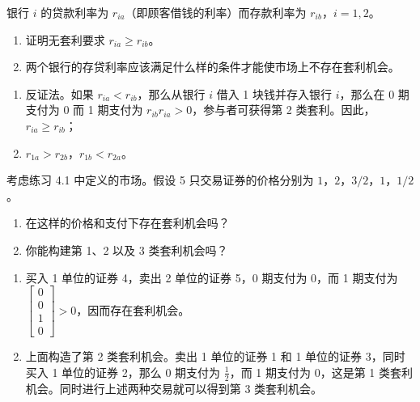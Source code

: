 \begin{problem}
 银行 $i$ 的贷款利率为 $r_{ia}$（即顾客借钱的利率）而存款利率为 $r_{ib}$，$i=1,2$。
\begin{enumerate}[label=(\alph*)]
    \item 证明无套利要求 $r_{ia}\ge r_{ib}$。
    \item 两个银行的存贷利率应该满足什么样的条件才能使市场上不存在套利机会。
\end{enumerate}
\end{problem}
\begin{solution}
\begin{enumerate}[label=(\alph*)]
    \item 反证法。如果 $r_{ia}<r_{ib}$，那么从银行 $i$ 借入 1 块钱并存入银行 $i$，那么在 0 期支付为 0 而 1 期支付为 $r_{ib}r_{ia}>0$，参与者可获得第 2 类套利。因此，$r_{ia}\ge r_{ib}$；
    \item $r_{1a}>r_{2b}$，$r_{1b}<r_{2a}$。
\end{enumerate}
\end{solution}

\begin{problem}
 考虑练习 4.1 中定义的市场。假设 5 只交易证券的价格分别为 $1$，$2$，$3/2$，$1$，$1/2$。
\begin{enumerate}[label=(\alph*)]
    \item 在这样的价格和支付下存在套利机会吗？
    \item 你能构建第 1、2 以及 3 类套利机会吗？
\end{enumerate}
\end{problem}
\begin{solution}
\begin{enumerate}[label=(\alph*)]
    \item 买入 1 单位的证券 4，卖出 2 单位的证券 5，0 期支付为 0，而 1 期支付为 $\begin{bmatrix}0 \\ 0 \\ 1 \\ 0\end{bmatrix}>0$，因而存在套利机会。
    \item 上面构造了第 2 类套利机会。卖出 1 单位的证券 1 和 1 单位的证券 3，同时买入 1 单位的证券 2，那么 0 期支付为 $\tfrac12$，而 1 期支付为 0，这是第 1 类套利机会。同时进行上述两种交易就可以得到第 3 类套利机会。
\end{enumerate}
\end{solution}

